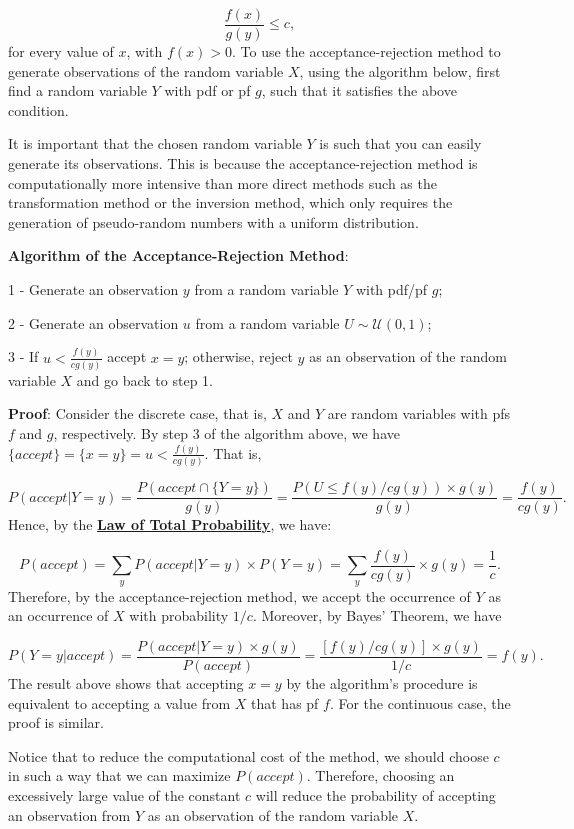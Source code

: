 \[\frac{f(x)}{g(y)} \leq c,\] for every value of \(x\), with \(f(x) > 0\). To use the acceptance-rejection method to generate observations of the random variable \(X\), using the algorithm below, first find a random variable \(Y\) with pdf or pf \(g\), such that it satisfies the above condition.

It is important that the chosen random variable \(Y\) is such that you can easily generate its observations. This is because the acceptance-rejection method is computationally more intensive than more direct methods such as the transformation method or the inversion method, which only requires the generation of pseudo-random numbers with a uniform distribution.

\textbf{Algorithm of the Acceptance-Rejection Method}:

1 - Generate an observation \(y\) from a random variable \(Y\) with pdf/pf \(g\);

2 - Generate an observation \(u\) from a random variable \(U\sim \mathcal{U} (0, 1)\);

3 - If \(u < \frac{f(y)}{cg(y)}\) accept \(x = y\); otherwise, reject \(y\) as an observation of the random variable \(X\) and go back to step 1.

\textbf{Proof}: Consider the discrete case, that is, \(X\) and \(Y\) are random variables with pfs \(f\) and \(g\), respectively. By step 3 of the algorithm above, we have \(\{accept\} =  \{x = y\} = u < \frac{f(y)}{cg(y)}\). That is,

\[P(accept | Y = y) = \frac{P(accept \cap \{Y = y\})}{g(y)} = \frac{P(U \leq f(y)/cg(y)) \times g(y)}{g(y)} = \frac{f(y)}{cg(y)}.\] Hence, by the \href{https://en.wikipedia.org/wiki/Law_of_total_probability}{\textbf{Law of Total Probability}}, we have:

\[P(accept) = \sum_y P(accept|Y=y)\times P(Y=y) = \sum_y \frac{f(y)}{cg(y)}\times g(y) = \frac{1}{c}.\] Therefore, by the acceptance-rejection method, we accept the occurrence of \(Y\) as an occurrence of \(X\) with probability \(1/c\). Moreover, by Bayes' Theorem, we have

\[P(Y = y | accept) = \frac{P(accept|Y = y)\times g(y)}{P(accept)} = \frac{[f(y)/cg(y)] \times g(y)}{1/c} = f(y).\] The result above shows that accepting \(x = y\) by the algorithm's procedure is equivalent to accepting a value from \(X\) that has pf \(f\). For the continuous case, the proof is similar.

Notice that to reduce the computational cost of the method, we should choose \(c\) in such a way that we can maximize \(P(accept)\). Therefore, choosing an excessively large value of the constant \(c\) will reduce the probability of accepting an observation from \(Y\) as an observation of the random variable \(X\).

